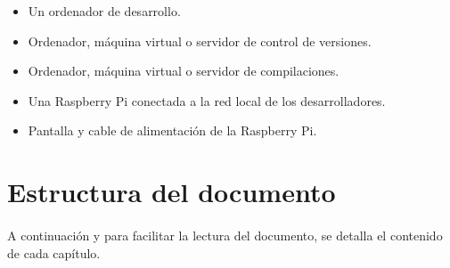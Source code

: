 \begin{itemize}
	\item Un ordenador de desarrollo.
	\item Ordenador, máquina virtual o servidor de control de versiones.
	\item Ordenador, máquina virtual o servidor de compilaciones.
	\item Una Raspberry Pi conectada a la red local de los desarrolladores.
	\item Pantalla y cable de alimentación de la Raspberry Pi.
\end{itemize}

\section{Estructura del documento}

\paragraph{}A continuación y para facilitar la lectura del documento, se detalla el
contenido de cada capítulo.

